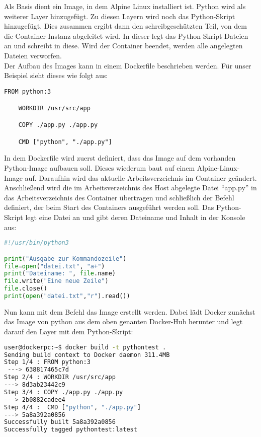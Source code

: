 Als Basis dient ein Image, in dem Alpine Linux installiert ist. Python wird als weiterer Layer hinzugefügt. Zu diesen Layern wird noch das Python-Skript hinzugefügt. Dies zusammen ergibt dann den schreibgeschützten Teil, von dem die Container-Instanz abgeleitet wird. In dieser legt das Python-Skript Dateien an und schreibt in diese. Wird der Container beendet, werden alle angelegten Dateien verworfen.\\
Der Aufbau des Images kann in einem Dockerfile beschrieben werden. Für unser Beispiel sieht dieses wie folgt aus:

\begin{lstlisting}[language=docker,caption={Dockerfile},label={code:dockerfile}]
    FROM python:3 
    
    WORKDIR /usr/src/app
    
    COPY ./app.py ./app.py
    
    CMD ["python", "./app.py"]
\end{lstlisting}

In dem Dockerfile wird zuerst definiert, dass das Image auf dem vorhanden Python-Image aufbauen soll. Dieses wiederum baut auf einem Alpine-Linux-Image auf. Daraufhin wird das aktuelle Arbeitsverzeichnis im Container geändert. Anschließend wird die im Arbeitsverzeichnis des Host abgelegte Datei "`app.py"' in das Arbeitsverzeichnis des Container übertragen und schließlich der Befehl definiert, der beim Start des Containers ausgeführt werden soll. Das Python-Skript legt eine Datei an und gibt deren Dateiname und Inhalt in der Konsole aus:
\begin{lstlisting}[language=python,caption={app.py},label={code:pythonapp}]
#!/usr/bin/python3

print("Ausgabe zur Kommandozeile")
file=open("datei.txt", "a+")
print("Dateiname: ", file.name)
file.write("Eine neue Zeile")
file.close()
print(open("datei.txt","r").read())
\end{lstlisting}
Nun kann mit dem Befehl  das Image erstellt werden. Dabei lädt Docker zunächst das Image von python aus dem oben genanten Docker-Hub herunter und legt darauf den Layer mit dem Python-Skript:

\begin{lstlisting}[language=bash,caption={Terminalausgabe docker build},label={code:dockerbuild}]
user@dockerpc:~$ docker build -t pythontest .
Sending build context to Docker daemon 311.4MB
Step 1/4 : FROM python:3
 ---> 638817465c7d
Step 2/4 : WORKDIR /usr/src/app
---> 8d3ab23442c9
Step 3/4 : COPY ./app.py ./app.py
---> 2b0882cadee4
Step 4/4 :  CMD ["python", "./app.py"]
---> 5a8a392a0856
Successfully built 5a8a392a0856
Successfully tagged pythontest:latest
\end{lstlisting}

